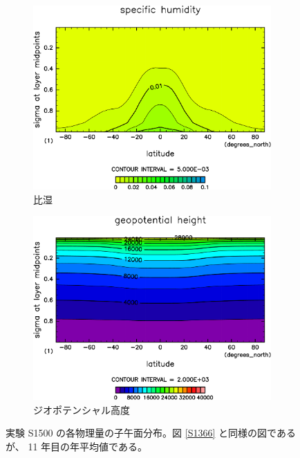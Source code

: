\documentclass[body]{subfiles}
\begin{document}
\begin{figure}[t]
\begin{subfigure}{.4\textwidth}
		\includegraphics[width=\columnwidth]{S1500/QH2OVap,time=3650:4015-crop-rotate.pdf}
		\caption{比湿\hmu*{[kg/kg]}}\label{S1500比湿}
	\end{subfigure}
	\begin{subfigure}{.4\textwidth}
		\centering
		\includegraphics[width=\columnwidth]{S1500/Height,time=3650:4015-crop-rotate.pdf}
		\caption{ジオポテンシャル高度\hmu*{[m]}}\label{S1500ジオポテンシャル高度}
	\end{subfigure}
	\caption[実験 S1500 の各物理量の子午面分布]{
		実験 S1500 の各物理量の子午面分布。図 \ref{S1366} と同様の図であるが、
		11 年目の年平均値である。
	}\label{S1500}
\end{figure}
\end{document}
